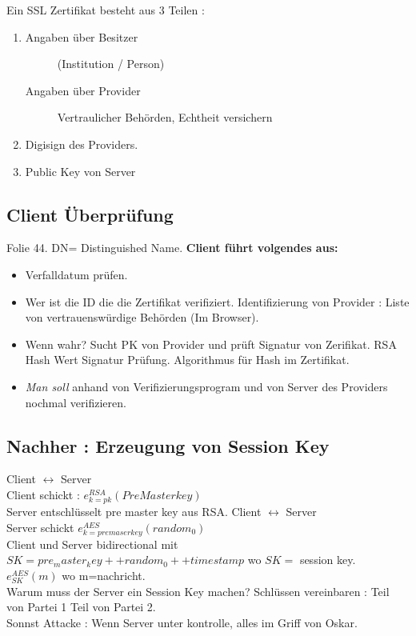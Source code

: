 \documentclass[a4paper,10pt]{scrreprt}
\begin{document}
Ein SSL Zertifikat besteht aus 3 Teilen :
\begin{enumerate}
 \item \begin{description}
        \item [Angaben über Besitzer] (Institution / Person)
        \item [Angaben über Provider] Vertraulicher Behörden, Echtheit versichern
       \end{description}
\item Digisign des Providers.
\item Public Key von Server
\end{enumerate}

\subsection{Client Überprüfung}
Folie 44.
DN= Distinguished Name.
\textbf{Client führt volgendes aus:}
\begin{itemize}
 \item Verfalldatum prüfen.
 \item Wer ist die ID die die Zertifikat verifiziert. Identifizierung von Provider : Liste von vertrauenswürdige 
Behörden (Im Browser).
 \item Wenn wahr? Sucht PK von Provider und prüft Signatur von Zerifikat. RSA Hash Wert Signatur Prüfung. Algorithmus 
für Hash im Zertifikat.
 \item \textit{Man soll} anhand von Verifizierungsprogram und von Server des Providers nochmal verifizieren.
\end{itemize}

\subsection{Nachher : Erzeugung von Session Key}
Client $ \longleftrightarrow $ Server\\
Client schickt : $ e_{k=pk}^{RSA}(Pre Master key)$ \\
Server entschlüsselt pre master key aus RSA.
Client $ \longleftrightarrow $ Server\\
Server schickt $e_{k=pre maser key}^{AES}(random_0)$ \\
Client und Server bidirectional mit $ SK = pre_master_key ++ random_0 ++ timestamp $ wo $SK =$ session key.\\
$e_{SK}^{AES} (m)$ wo m=nachricht. \\

Warum muss der Server ein Session Key machen? Schlüssen vereinbaren : Teil von Partei 1 Teil von Partei 2.\\
Sonnst Attacke : Wenn Server unter kontrolle, alles im Griff von Oskar. \\
\end{document}
